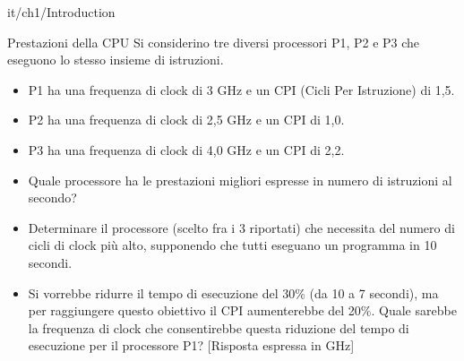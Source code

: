 \documentclass[11pt]{article}
\begin{document}
\begin{quiz}{it/ch1/Introduction}
\begin{cloze}[points=1,shuffle=false]{Prestazioni della CPU}
Si considerino tre diversi processori P1, P2 e P3 che eseguono lo stesso insieme di istruzioni. 
\begin{itemize}
    \item P1 ha una frequenza di clock di 3 GHz e un CPI (Cicli Per Istruzione) di 1,5.
    \item P2 ha una frequenza di clock di 2,5 GHz e un CPI di 1,0.
    \item P3 ha una frequenza di clock di 4,0 GHz e un CPI di 2,2.
\end{itemize}
%    
\begin{itemize}
    \item Quale processore ha le prestazioni migliori espresse in numero di istruzioni al secondo? 
    \item Determinare il processore (scelto fra i 3 riportati) che necessita del numero di cicli di clock più alto, supponendo che tutti eseguano un programma in 10 secondi.
    \item Si vorrebbe ridurre il tempo di esecuzione del 30\% (da 10 a 7 secondi), ma per raggiungere questo obiettivo il CPI aumenterebbe del 20\%. Quale sarebbe la frequenza di clock che consentirebbe questa riduzione del tempo di esecuzione per il processore P1? 
    [Risposta espressa in GHz]
\end{itemize}
\end{cloze}


\end{quiz}
\end{document}
